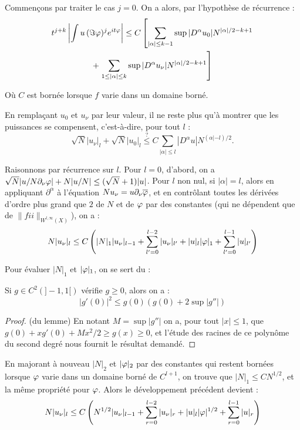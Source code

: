 Commençons par traiter le cas $j=0$. On a alors, par l'hypothèse de récurrence :
\begin{multline*}
  t^{j+k}\left|\int u\,(\Im \varphi)^je^{it\varphi} \right| \leq
  C\left[\sum_{|\alpha| \leq k-1}\sup |D^{\alpha}u_0|N^{|\alpha|/2-k+1}\right. \\+
    \left.\sum_{1 \leq |\alpha| \leq k}\sup
    |D^{\alpha}u_{\nu}|N^{|\alpha|/2-k+1}\right] 
\end{multline*}

\noindent Où $C$ est bornée lorsque $f$ varie dans un domaine borné.

En remplaçant $u_0$ et $u_{\nu}$ par leur valeur, il ne reste plus qu'à montrer que les puissances se compensent, c'est-à-dire, pour tout $l$ :
\begin{equation*}
  \sqrt{N}|u_{\nu}|_l + \sqrt{N}|u_0|_l \stackrel{?}{\leq} C \sum_{|\alpha| \leq l}|D^{\alpha}u|N^{(\alpha|-l)/2}.
\end{equation*}

Raisonnons par récurrence sur $l$. Pour $l=0$, d'abord, on a  $\sqrt{N} |u/N \partial_{\nu}\varphi| + N |u/N| \leq (\sqrt{N}+1)|u|$. Pour $l$ non nul, si $|\alpha|=l$, alors en appliquant $\partial^{\alpha}$ à l'équation $Nu_{\nu}=u \partial_{\nu}\overline{\varphi}$, et en contrôlant toutes les dérivées d'ordre plus grand que $2$ de $N$ et de $\varphi$ par des constantes (qui ne dépendent que de $\|fii\|_{W^{l,\infty}(X)}$), on a :
\begin{equation*}
  N|u_{\nu}|_l \leq C\left(|N|_1|u_{\nu}|_{l-1} + \sum_{l'=0}^{l-2}|u_{\nu}|_{l'} + |u|_l|\varphi|_1 + \sum_{l'=0}^{l-1}|u|_{l'}\right)
\end{equation*}

Pour évaluer $|N|_1$ et $|\varphi|_1$, on se sert du :
\begin{lem}
  \label{horm7.7.2}
  Si $g \in C^2(]-1,1[)$ vérifie $g \geq 0$, alors on a :
  \begin{equation*}
    |g'(0)|^2 \leq g(0)\left(g(0) + 2 \sup |g''|\right)
  \end{equation*}
\end{lem}
\begin{proof} (du lemme) En notant $M= \sup |g''|$ on a, pour tout $|x| \leq 1$, que $g(0)+xg'(0)+Mx^2/2 \geq g(x) \geq 0$, et l'étude des racines de ce polynôme du second degré nous fournit le résultat demandé.\end{proof}

En majorant à nouveau $|N|_2$ et $|\varphi|_2$ par des constantes qui restent bornées lorsque $\varphi$ varie dans un domaine borné de $C^{l+1}$, on trouve que $|N|_1 \leq C N^{1/2}$, et la même propriété pour $\varphi$. Alors le développement précédent devient :
\begin{equation*}
  N|u_{\nu}|_l \leq C\left(N^{1/2}|u_{\nu}|_{l-1} + \sum_{r=0}^{l-2}|u_{\nu}|_{r} + |u|_l|\varphi|^{1/2} + \sum_{r=0}^{l-1}|u|_{r}\right)
\end{equation*}

